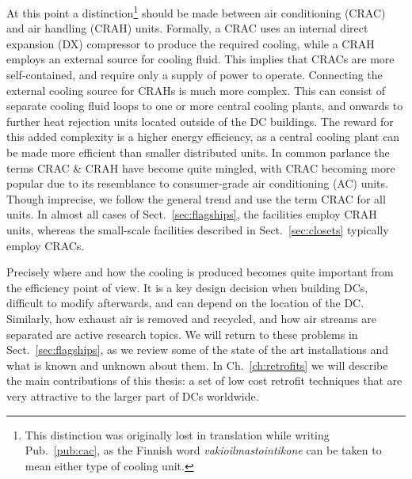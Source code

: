 \documentclass[officiallayout]{tktla}
\begin{document}
At this point a distinction\footnote{This distinction was originally lost in
translation while writing Pub.~\ref{pub:cac}, as the Finnish word
\emph{vakioilmastointikone} can be taken to mean either type of cooling
unit.} should be made between air conditioning (CRAC) and air handling (CRAH)
units. Formally, a CRAC uses an internal direct expansion (DX) compressor to
produce the required cooling, while a CRAH employs an external source for
cooling fluid.  This implies that CRACs are more self-contained, and require
only a supply of power to operate.  Connecting the external cooling source for
CRAHs is much more complex. This can consist of separate cooling fluid loops
to one or more central cooling plants, and onwards to further heat rejection
units located outside of the DC buildings. The reward for this added
complexity is a higher energy efficiency, as a central cooling plant can be
made more efficient than smaller distributed units. In common parlance the
terms CRAC \& CRAH have become quite mingled, with CRAC becoming more popular
due to its resemblance to consumer-grade air conditioning (AC) units.  Though
imprecise, we follow the general trend and use the term CRAC for all units. In
almost all cases of Sect.~\ref{sec:flagships}, the facilities employ CRAH
units, whereas the small-scale facilities described in Sect.~\ref{sec:closets}
typically employ CRACs.

Precisely where and how the cooling is produced becomes quite important from
the efficiency point of view. It is a key design decision when building DCs,
difficult to modify afterwards, and can depend on the location of the DC.
Similarly, how exhaust air is removed and recycled, and how air streams are
separated are active research topics. We will return to these problems in
Sect.~\ref{sec:flagships}, as we review some of the state of the art
installations and what is known and unknown about them. In
Ch.~\ref{ch:retrofits} we will describe the main contributions of this thesis:
a set of low cost retrofit techniques that are very attractive to the larger
part of DCs worldwide.
\end{document}
